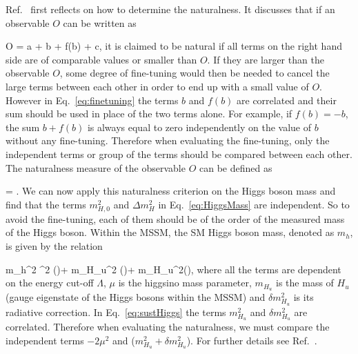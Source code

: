 Ref.~\cite{Baer:2016bwh} first reflects on how to determine the naturalness.  It discusses that if an observable $O$ can be written as

{
O = a + b + f(b) + c,
}
it is claimed to be natural if all terms on the right hand side are of comparable values or smaller than $O$. If they are larger than the observable $O$, some degree of fine-tuning would then be needed to cancel the large terms between each other in order to end up with a small value of $O$. However in Eq.~\ref{eq:finetuning} the terms $b$ and $f(b)$ are correlated and their sum should be used in place of the two terms alone. For example, if $f(b) = -b$, the sum $b+f(b)$ is always equal to zero independently on the value of $b$ without any fine-tuning. Therefore when evaluating the fine-tuning, only the independent terms or group of the terms should be compared between each other. The naturalness measure of the observable $O$ can be defined as 

{
\Delta = .
}
We can now apply this naturalness criterion on the Higgs boson mass and find that the terms $m_{H,0}^{2}$ and $\Delta m_{H}^{2}$ in Eq.~\ref{eq:HiggsMass} are independent. So to avoid the fine-tuning, each of them should be of the order of the measured mass of the Higgs boson. Within the MSSM, the SM Higgs boson mass, denoted as $m_{h}$, is given by the relation

{
m_{h}^{2}  \mu^{2} (\Lambda)+ m_{H_{u}}^{2} (\Lambda)+ \delta m_{H_{u}}^{2}(\Lambda),
}
where all the terms are dependent on the energy cut-off $\Lambda$, $\mu$ is the higgsino mass parameter, $m_{H_{u}}$ is the mass of $H_{u}$ (gauge eigenstate of the Higgs bosons within the MSSM)  and $\delta m_{H_{u}}^{2}$ is its radiative correction. In Eq.~\ref{eq:sustHiggs} the terms $m_{H_{u}}^{2}$ and  $\delta m_{H_{u}}^{2}$ are correlated. Therefore when evaluating the naturalness, we must compare the independent terms $-2 \mu^{2}$ and ($m_{H_{u}}^{2} + \delta m_{H_{u}}^{2}$). For further details see Ref.~\cite{Baer:2016bwh}.




